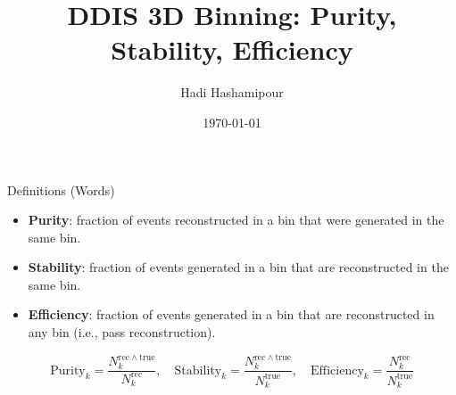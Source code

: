 \documentclass[aspectratio=169]{beamer}
\title{DDIS 3D Binning: Purity, Stability, Efficiency}
\author{Hadi Hashamipour}
\date{\today}
\begin{document}
\begin{frame}
  \titlepage
\end{frame}

\begin{frame}{Definitions (Words)}
  \begin{itemize}
    \item \textbf{Purity}: fraction of events reconstructed in a bin that were generated in the same bin.
    \item \textbf{Stability}: fraction of events generated in a bin that are reconstructed in the same bin.
    \item \textbf{Efficiency}: fraction of events generated in a bin that are reconstructed in any bin (i.e., pass reconstruction).
  \end{itemize}
  \vspace{0.2cm}
  \small
  \[
    \mathrm{Purity}_k = \frac{N^{\mathrm{rec}\land\mathrm{true}}_k}{N^{\mathrm{rec}}_k},\quad
    \mathrm{Stability}_k = \frac{N^{\mathrm{rec}\land\mathrm{true}}_k}{N^{\mathrm{true}}_k},\quad
    \mathrm{Efficiency}_k = \frac{N^{\mathrm{rec}}_k}{N^{\mathrm{true}}_k}
  \]
\end{frame}
\end{document}
